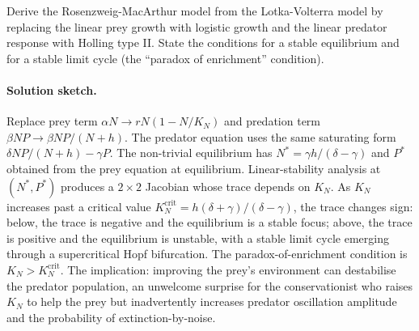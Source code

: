 \begin{exercise}
Derive the Rosenzweig-MacArthur model from the Lotka-Volterra model
by replacing the linear prey growth with logistic growth and the
linear predator response with Holling type II. State the conditions
for a stable equilibrium and for a stable limit cycle (the
``paradox of enrichment'' condition).

\paragraph{Solution sketch.} Replace prey term $\alpha N \to rN(1 -
N/K_N)$ and predation term $\beta NP \to \beta NP/(N + h)$. The
predator equation uses the same saturating form
$\delta NP/(N + h) - \gamma P$. The non-trivial equilibrium has
$N^* = \gamma h / (\delta - \gamma)$ and $P^*$ obtained from the
prey equation at equilibrium. Linear-stability analysis at
$(N^*, P^*)$ produces a $2 \times 2$ Jacobian whose trace depends on
$K_N$. As $K_N$ increases past a critical value
$K_N^{\mathrm{crit}} = h(\delta + \gamma)/(\delta - \gamma)$, the
trace changes sign: below, the trace is negative and the equilibrium
is a stable focus; above, the trace is positive and the equilibrium
is unstable, with a stable limit cycle emerging through a
supercritical Hopf bifurcation. The paradox-of-enrichment condition
is $K_N > K_N^{\mathrm{crit}}$. The implication: improving the
prey's environment can destabilise the predator population, an
unwelcome surprise for the conservationist who raises $K_N$ to
help the prey but inadvertently increases predator oscillation
amplitude and the probability of extinction-by-noise.
\end{exercise}

